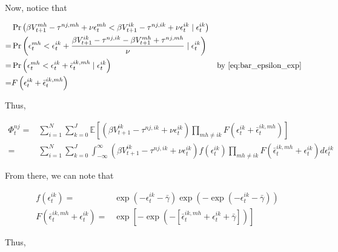 \documentclass[10pt]{article}
\begin{document}
Now, notice that 

\begin{align}
    &\Pr\left(\beta V_{t+1}^{m h}-\tau^{n j, m h}+\nu \epsilon_t^{m h}<\beta V_{t+1}^{i k}-\tau^{n j, i k}+\nu \epsilon_t^{i k} \mid \epsilon_t^{i k}\right) \\
    = &\Pr\left(\epsilon_t^{m h} < \epsilon_t^{i k}+\frac{\beta V_{t+1}^{i k}-\tau^{n j, i k}-\beta V_{t+1}^{m h}+\tau^{n j, m h}}{\nu} \mid \epsilon_t^{i k}\right) \\
    = &\Pr\left(\epsilon_t^{m h} < \epsilon_t^{i k}+\bar{\epsilon}_t^{i k, m h} \mid \epsilon_t^{i k}\right) && \text{by \eqref{eq:bar_epsilon_exp}} \\
    = &F\left(\epsilon_t^{i k}+\bar{\epsilon}_t^{i k, m h}\right) \\
\end{align}

Thus,

\begin{align}
    \Phi_t^{n j} = &\sum_{i=1}^N \sum_{k=0}^J \mathbb{E}\left[ \left(\beta V_{t+1}^{i k}-\tau^{n j, i k}+\nu \epsilon_t^{i k}\right) \prod_{m h \neq i k} F\left(\epsilon_t^{i k}+\bar{\epsilon}_t^{i k, m h}\right) \right] \\
     = &\sum_{i=1}^N \sum_{k=0}^J \int_{-\infty}^{\infty}\left(\beta V_{t+1}^{i k}-\tau^{n j, i k}+\nu \epsilon_t^{i k}\right) f\left(\epsilon_t^{i k}\right) \prod_{m h \neq i k} F\left(\bar{\epsilon}_t^{i k, m h}+\epsilon_t^{i k}\right) d \epsilon_t^{i k}
\end{align}

From there, we can note that

\begin{align}
    f\left(\epsilon_t^{i k}\right) = &\exp ( - \epsilon_t^{i k} - \bar{\gamma}) \exp \left( -\exp \left( - \epsilon_t^{i k} - \bar{\gamma} \right) \right) \\
    F\left(\bar{\epsilon}_t^{i k, m h}+\epsilon_t^{i k}\right)= &\exp \left[-\exp \left(-\left[\bar{\epsilon}_t^{i k, m h}+\epsilon_t^{i k}+\bar{\gamma}\right]\right)\right]
\end{align}

Thus,
\end{document}
